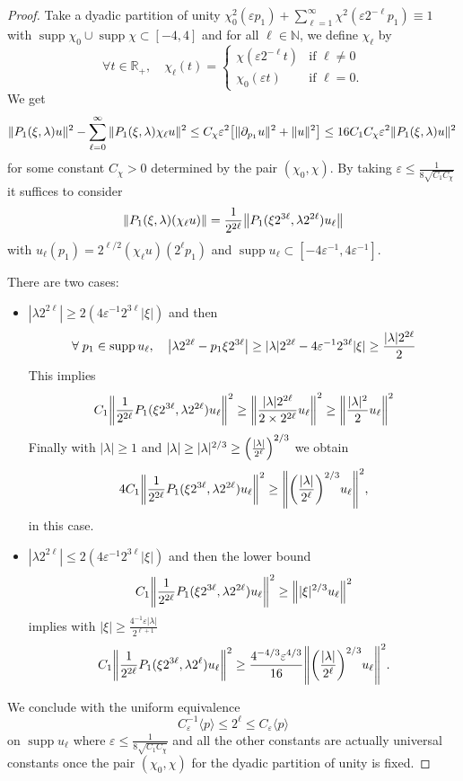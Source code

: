 \documentclass[AHL,Unicode,longabstracts]{cedram}
\newcommand{\R}{\mathbb{R}}
\newcommand{\N}{\mathbb{N}}
\DeclareMathOperator{\suppp}{supp}
\let\oldforall\forall
\renewcommand*{\forall}{\mathrel{\oldforall}}
\let\originalleft\left
\let\originalright\right
\renewcommand{\left}{\mathopen{}\mathclose\bgroup\originalleft}
\renewcommand{\right}{\aftergroup\egroup\originalright}
\begin{document}
\begin{proof}
Take a dyadic partition of unity $\chi_{0}^{2}(\varepsilon p_{1})+\sum_{\ell=1}^{\infty}\chi^{2}(\varepsilon 2^{-\ell}p_{1})\equiv 1$ with $\suppp \chi_{0}\cup \suppp\chi\subset [-4,4]$ and for all $ \ell \in \N$, we define $\chi_{\ell}$ by
\[
\forall t\in \R_+,\quad \chi_{\ell}(t) =
\begin{cases}
\chi(\varepsilon 2^{-\ell}t) &\text{if } \ell \neq 0\\
\chi_0(\varepsilon t) &\text{if } \ell=0 .
\end{cases}
\]
We get
\[
\|P_{1}(\xi,\lambda)u\|^{2}-\sum_{\ell=0}^{\infty}\|P_{1}(\xi,\lambda)\chi_{\ell}u\|^{2}\leq C_{\chi}\varepsilon^{2}\left[\|\partial_{p_{1}}u\|^{2}+\|u\|^{2}\right]
\leq 16C_{1}C_{\chi}\varepsilon^{2}\|P_{1}(\xi,\lambda)u\|^{2}\,
\]
for some constant $C_{\chi}>0$ determined by the pair $(\chi_0,\chi)$. By taking $\varepsilon\leq \frac{1}{8\sqrt{C_{1}C_{\chi}}}$ it suffices to consider
\[
\|P_{1}(\xi,\lambda)(\chi_{\ell}u)\|=\frac{1}{2^{2\ell}}\left\|P_{1}(\xi 2^{3\ell},\lambda 2^{2\ell})u_{\ell}\right\|
\]
with $u_{\ell}(p_{1})=2^{\ell/2}(\chi_{\ell}u)(2^{\ell}p_{1})$ and $\suppp u_{\ell}\subset [-4\varepsilon^{-1},4\varepsilon^{-1}]$.

There are two cases:
\begin{itemize}
\item $|\lambda 2^{2\ell}|\geq 2(4\varepsilon^{-1}2^{3\ell}|\xi|)$ and then
\[
\forall p_{1}\in \suppp u_{\ell},\quad\left|\lambda 2^{2\ell}-p_{1}\xi 2^{3\ell}\right|\geq |\lambda|2^{2\ell}-4\varepsilon^{-1}2^{3\ell}|\xi|
\geq \frac{|\lambda| 2^{2\ell}}{2}
\]
This implies
\[
C_{1}\left\|\frac{1}{2^{2\ell}}P_1(\xi 2^{3\ell},\lambda 2^{2\ell})u_{\ell}\right\|^{2}\geq \left\|\frac{|\lambda|2^{2\ell}}{2\times 2^{2\ell}}u_{\ell}\right\|^{2}\geq \left\|\frac{|\lambda|^{2}}{2}u_{\ell}\right\|^{2}
\]
Finally with $|\lambda|\geq 1$ and $|\lambda|\geq |\lambda|^{2/3}\geq \left(\frac{|\lambda|}{2^{\ell}}\right)^{2/3}$ we obtain
\[
4C_{1}\left\|\frac{1}{2^{2\ell}}P_1(\xi 2^{3\ell},\lambda 2^{2\ell})u_{\ell}\right\|^{2}\geq \left\|\left(\frac{|\lambda|}{2^{\ell}}\right)^{2/3}u_{\ell}\right\|^{2},
\]
in this case.
\item $|\lambda 2^{2\ell}|\leq 2 (4\varepsilon^{-1}2^{3\ell}|\xi|)$ and then the lower bound
\[
C_{1}\left\|\frac{1}{2^{2\ell}}P_{1}(\xi 2^{3\ell},\lambda 2^{2\ell})u_{\ell}\right\|^{2}\geq\left\||\xi|^{2/3}u_{\ell}\right\|^{2}
\]
implies with $|\xi|\geq \frac{4^{-1}\varepsilon |\lambda|}{2^{\ell+1}}$
\[
C_{1}\left\|\frac{1}{2^{2\ell}}P_{1}(\xi 2^{3\ell},\lambda 2^{\ell})u_{\ell}\right\|^{2}\geq \frac{4^{-4/3}\varepsilon^{4/3}}{16}\left\|\left(\frac{|\lambda|}{2^{\ell}}\right)^{2/3}u_{\ell}\right\|^{2}. 
\]
\end{itemize}
We conclude with the uniform equivalence
\[
C_{\varepsilon}^{-1}\langle p\rangle\leq 2^{\ell}\leq C_{\varepsilon}\langle p\rangle
\]
on $\suppp u_{\ell}$ where $\varepsilon\leq\frac{1}{8\sqrt{C_1 C_{\chi}}}$ and all the other constants are actually universal constants once the pair $(\chi_0,\chi)$ for the dyadic partition of unity is fixed.
\end{proof}
\end{document}
